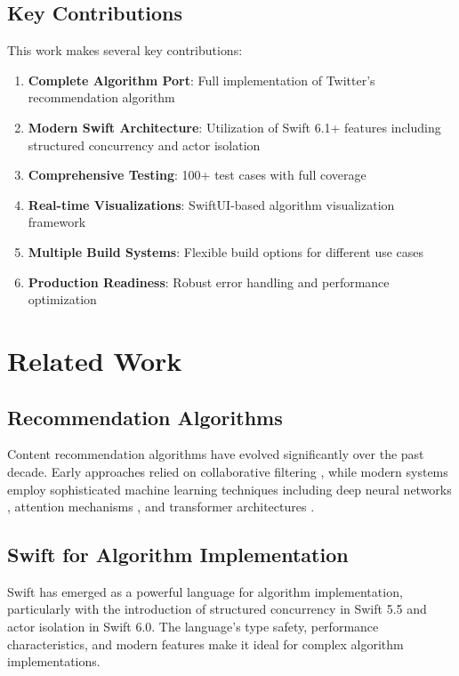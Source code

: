 \documentclass[11pt,a4paper]{article}
\begin{document}
\subsection{Key Contributions}

This work makes several key contributions:
\begin{enumerate}
    \item \textbf{Complete Algorithm Port}: Full implementation of Twitter's recommendation algorithm
    \item \textbf{Modern Swift Architecture}: Utilization of Swift 6.1+ features including structured concurrency and actor isolation
    \item \textbf{Comprehensive Testing}: 100+ test cases with full coverage
    \item \textbf{Real-time Visualizations}: SwiftUI-based algorithm visualization framework
    \item \textbf{Multiple Build Systems}: Flexible build options for different use cases
    \item \textbf{Production Readiness}: Robust error handling and performance optimization
\end{enumerate}

\section{Related Work}

\subsection{Recommendation Algorithms}

Content recommendation algorithms have evolved significantly over the past decade. Early approaches relied on collaborative filtering \cite{resnick1994grouplens}, while modern systems employ sophisticated machine learning techniques including deep neural networks \cite{cheng2016wide}, attention mechanisms \cite{vaswani2017attention}, and transformer architectures \cite{devlin2018bert}.

\subsection{Swift for Algorithm Implementation}

Swift has emerged as a powerful language for algorithm implementation, particularly with the introduction of structured concurrency in Swift 5.5 and actor isolation in Swift 6.0. The language's type safety, performance characteristics, and modern features make it ideal for complex algorithm implementations.
\end{document}
